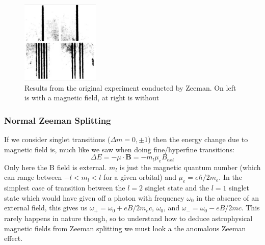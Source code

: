 \documentclass{article}
\begin{document}
 \begin{figure}[ht]
     \centering
     \includegraphics[width=0.33\textwidth]{zeeman1.png}
     \caption{Results from the original experiment conducted by Zeeman. On left is with a magnetic field, at right is without}
     \label{fig:zeeman_exp}
 \end{figure}
 
 \subsubsection{Normal Zeeman Splitting}
 If we consider singlet transitions ($\Delta m = 0, \pm 1$) then the energy change due to magnetic field is, much like we saw when doing fine/hyperfine transitions:
\begin{equation} 
\Delta E = -\mu \cdot \mathbf{B} = - m_l \mu_e B_{ext}
\end{equation}
Only here the B field is external. $m_l$ is just the magnetic quantum number (which can range between $-l < m_l < l$ for a given orbital) and $\mu_e = e\hbar/2m_e$. In the simplest case of transition between the $l = 2$ singlet state and the $l = 1$ singlet state which would have given off a photon with frequency $\omega_0$ in the absence of an external field, this gives us $\omega_+ = \omega_0 + eB/2m_e c$, $\omega_0$, and $\omega_- =  \omega_0 - eB/2mc$. This rarely happens in nature though, so to understand how to deduce astrophysical magnetic fields from Zeeman splitting we must look a the anomalous Zeeman effect.
\end{document}
